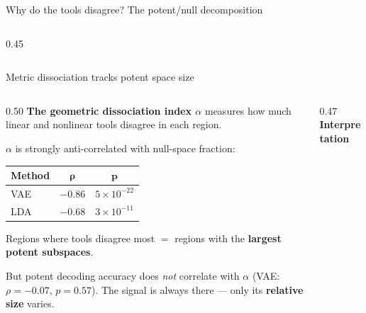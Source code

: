 \documentclass[aspectratio=169,11pt]{beamer}
\begin{document}
\begin{frame}{Why do the tools disagree? The potent/null decomposition}
\begin{columns}[T]
\begin{column}{0.45\textwidth}
\end{column}
\end{columns}
\end{frame}

\begin{frame}{Metric dissociation tracks potent space size}

\begin{columns}[T]
\begin{column}{0.50\textwidth}
\textbf{The geometric dissociation index $\alpha$} measures how much linear and nonlinear tools disagree in each region.

\vspace{0.5em}
{\small $\alpha$ is strongly anti-correlated with null-space fraction:}

\vspace{0.3em}
{\small
\begin{tabular}{lcc}
\toprule
\textbf{Method} & $\boldsymbol{\rho}$ & $\boldsymbol{p}$ \\
\midrule
VAE & $-0.86$ & $5 \times 10^{-22}$ \\
LDA & $-0.68$ & $3 \times 10^{-11}$ \\
\bottomrule
\end{tabular}
}

\vspace{0.5em}
{\small Regions where tools disagree most $=$ regions with the \textbf{largest potent subspaces}.}

\vspace{0.5em}
{\small But potent decoding accuracy does \emph{not} correlate with $\alpha$ (VAE: $\rho = -0.07$, $p = 0.57$). The signal is always there --- only its \textbf{relative size} varies.}
\end{column}

\begin{column}{0.47\textwidth}
\centering
\vspace{0.5em}
\textbf{Interpretation}

\vspace{0.5em}
\end{column}
\end{columns}
\end{frame}
\end{document}
